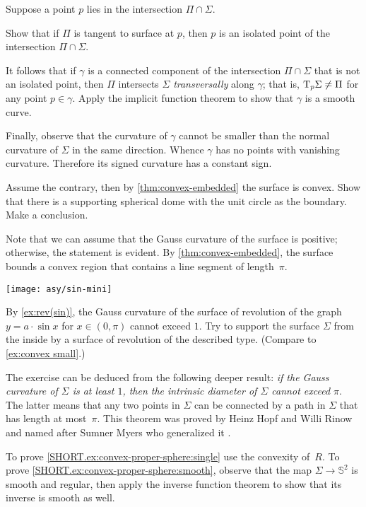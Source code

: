 \begin{multicols}{2}
{}

Suppose a point $p$ lies in the intersection $\Pi\cap\Sigma$.

Show that if $\Pi$ is tangent to surface at $p$,
then $p$ is an isolated point of the intersection $\Pi\cap\Sigma$.

It follows that if $\gamma$ is a connected component of the intersection $\Pi\cap\Sigma$ that is not an isolated point,
then $\Pi$ intersects $\Sigma$ \emph{transversally} along $\gamma$;
that is, $\mathrm{T}_p\Sigma\ne\Pi$ for any point $p \in \gamma$.
Apply the implicit function theorem to show that $\gamma$ is a smooth curve.

Finally, observe that the curvature of $\gamma$ cannot be smaller than the normal curvature of $\Sigma$ in the same direction.
Whence $\gamma$ has no points with vanishing curvature.
Therefore its signed curvature has a constant sign.


Assume the contrary, then by \ref{thm:convex-embedded} the surface is convex.
Show that there is a supporting spherical dome with the unit circle as the boundary.
Make a conclusion.

Note that we can assume that the Gauss curvature of the surface is positive; otherwise, the statement is evident.
By \ref{thm:convex-embedded}, the surface bounds a convex region that contains a line segment of length~$\pi$.

\begin{Figure}
\vskip-0mm
\centering
\texttt{[image: asy/sin-mini]}
\vskip-0mm
\end{Figure}

By \ref{ex:rev(sin)}, the Gauss curvature of the surface of revolution of the graph $y=a\cdot \sin x$ for $x\in(0,\pi)$ cannot exceed $1$.
Try to support the surface $\Sigma$ from the inside by a surface of revolution of the described type.
(Compare to \ref{ex:convex small}.)

The exercise can be deduced from the following deeper result: \textit{if the Gauss curvature of $\Sigma$ is at least $1$,
then
the intrinsic diameter of $\Sigma$ cannot exceed $\pi$}.
The latter means that any two points in $\Sigma$ can be connected by a path in $\Sigma$ that has length at most~$\pi$.
This theorem was proved by Heinz Hopf and Willi Rinow \cite{hopf-rinow} and 
named after Sumner Myers who generalized it \cite{myers}.


To prove \ref{SHORT.ex:convex-proper-sphere:single} use the convexity of~$R$.
To prove \ref{SHORT.ex:convex-proper-sphere:smooth}, observe that the map $\Sigma\to\mathbb{S}^2$ is smooth and regular, then apply the inverse function theorem to show that its inverse is smooth as well.


\end{multicols}
